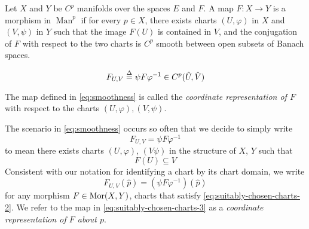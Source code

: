 \documentclass[../main-v2-manifolds.tex]{subfiles}
\begin{document}
\begin{definition}\label{def:smoothness}
Let $X$ and $Y$ be $C^p$ manifolds over the spaces $E$ and $F$. A map $F: X\to Y$ is a morphism in $\operatorname{Man}^p$ if for every $p\in X$, there exists charts $(U,\varphi)$ in $X$ and $(V,\psi)$ in $Y$ such that the image $F(U)$ is contained in $V$, and the conjugation of $F$ with respect to the two charts is $C^p$ smooth between open subsets of Banach spaces.

\begin{equation}\label{eq:smoothness}
    F_{U,V}\overset{\Delta}{=} \psi F \varphi^{-1} \in C^p(\hat{U},\hat{V})    
\end{equation}

The map defined in \cref{eq:smoothness} is called the \emph{coordinate representation of $F$} with respect to the charts $(U,\varphi), (V,\psi)$. 
\end{definition}

\begin{remark}
The scenario in \cref{eq:smoothness} occurs so often that we decide to simply write 
\begin{equation}\label{eq:suitably-chosen-charts-1}
    F_{U,V} = \psi F\varphi^{-1}
\end{equation}
to mean there exists charts $(U,\varphi)$, $(V\psi)$ in the structure of $X$, $Y$ such that 
\begin{equation}\label{eq:suitably-chosen-charts-2}
    F(U)\subseteq V
\end{equation}
Consistent with our notation for identifying a chart by its chart domain, we write 
\begin{equation}\label{eq:suitably-chosen-charts-3}
    F_{U,V}(\hat{p}) = (\psi F\varphi^{-1})(\hat{p})
\end{equation}
for any morphism $F\in \operatorname{Mor}(X,Y)$, charts that satisfy \cref{eq:suitably-chosen-charts-2}. We refer to the map in \cref{eq:suitably-chosen-charts-3} as a \emph{coordinate representation of $F$ about $p$}.
\end{remark}
\end{document}
